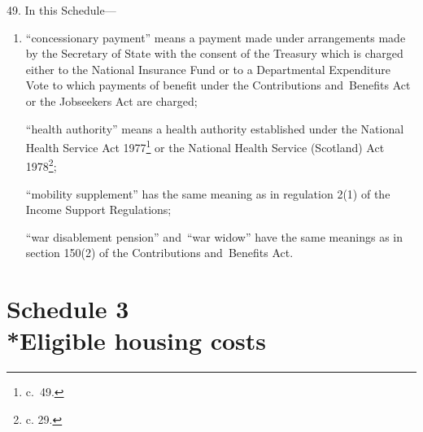 \documentclass[12pt,a4paper]{article}
\begin{document}

\medskip



\medskip

49.  In this Schedule—
\begin{enumerate}\item[]
“concessionary payment” means a payment made under arrangements made by the Secretary of State with the consent of the Treasury which is charged either to the National Insurance Fund or to a Departmental Expenditure Vote to which payments of benefit under the Contributions and~Benefits Act 
or the Jobseekers Act  %
are charged;

“health authority” means a health authority established under the National Health Service Act 1977\footnote{ c.~49.} or the National Health Service (Scotland) Act 1978\footnote{ c. 29.};

“mobility supplement” has the same meaning as in regulation 2(1) of the Income Support Regulations;

“war disablement pension” and~“war widow” have the same meanings as in section 150(2) of the Contributions and~Benefits Act.
\end{enumerate}


\part[Schedule 3 --- Eligible housing costs]{Schedule 3\\*Eligible housing costs}
\end{document}
